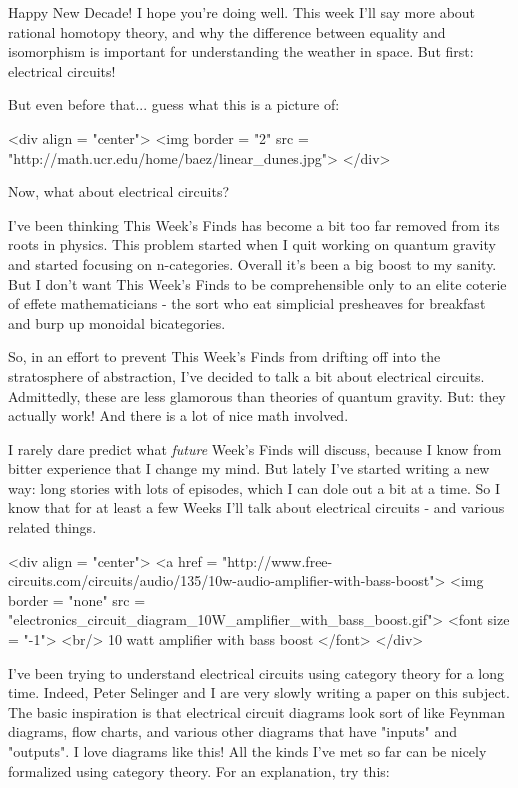 


Happy New Decade!  I hope you're doing well.  This week I'll say more
about rational homotopy theory, and why the difference between
equality and isomorphism is important for understanding the weather 
in space.  But first: electrical circuits!

But even before that... guess what this is a picture of:

<div align = "center">
<img border = "2" src = "http://math.ucr.edu/home/baez/linear_dunes.jpg">
</div>

Now, what about electrical circuits?

I've been thinking This Week's Finds has become a bit too far removed
from its roots in physics.  This problem started when I quit working
on quantum gravity and started focusing on n-categories.  Overall it's
been a big boost to my sanity.  But I don't want This Week's Finds to
be comprehensible only to an elite coterie of effete mathematicians -
the sort who eat simplicial presheaves for breakfast and burp up
monoidal bicategories.

So, in an effort to prevent This Week's Finds from drifting off into
the stratosphere of abstraction, I've decided to talk a bit about
electrical circuits.  Admittedly, these are less glamorous than
theories of quantum gravity.  But: they actually work!  And there is 
a lot of nice math involved.

I rarely dare predict what \emph{future} Week's Finds will discuss, because
I know from bitter experience that I change my mind.  But lately I've
started writing a new way: long stories with lots of episodes, which I
can dole out a bit at a time.  So I know that for at least a few Weeks
I'll talk about electrical circuits - and various related things.

<div align = "center">
<a href = "http://www.free-circuits.com/circuits/audio/135/10w-audio-amplifier-with-bass-boost">
<img border = "none" src = "electronics_circuit_diagram_10W_amplifier_with_bass_boost.gif">
<font size = "-1">
<br/> 10 watt amplifier with bass boost </font>
</div>

I've been trying to understand electrical circuits using category
theory for a long time.  Indeed, Peter Selinger and I are very slowly
writing a paper on this subject.  The basic inspiration is that
electrical circuit diagrams look sort of like Feynman diagrams, flow
charts, and various other diagrams that have "inputs" and
"outputs".  I love diagrams like this!  All the kinds I've
met so far can be nicely formalized using category theory.  For an
explanation, try this:

